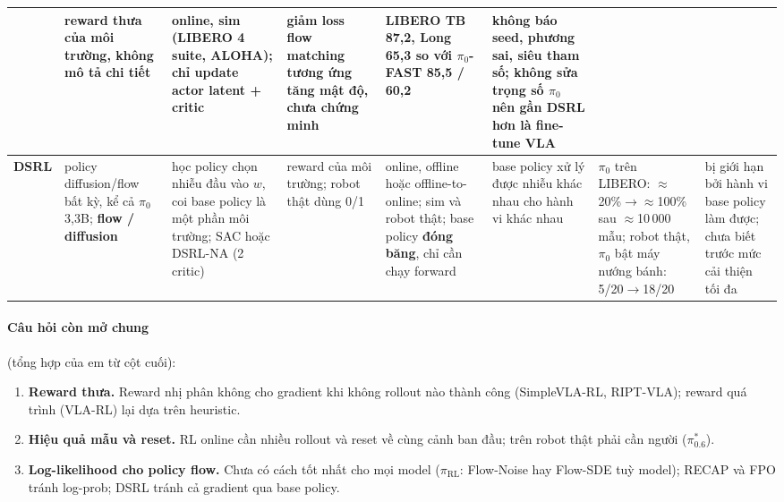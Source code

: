 \documentclass[9pt,a4paper]{extarticle}
\begin{document}
{\begin{longtable}{@{}L{2.0cm} L{2.6cm} L{3.6cm} L{2.7cm} L{3.0cm} L{3.0cm} L{3.3cm} L{3.4cm}@{}}
& reward thưa của môi trường, không mô tả chi tiết
& online, sim (LIBERO 4 suite, ALOHA); chỉ update actor latent + critic
& giảm loss flow matching tương ứng tăng mật độ, chưa chứng minh
& LIBERO TB 87,2, Long 65,3 so với $\pi_0$-FAST 85,5 / 60,2
& không báo seed, phương sai, siêu tham số; không sửa trọng số $\pi_0$ nên gần DSRL hơn là fine-tune VLA \\
\midrule
\textbf{DSRL}
& policy diffusion/flow bất kỳ, kể cả $\pi_0$ 3,3B; \textbf{flow / diffusion}
& học policy chọn nhiễu đầu vào $w$, coi base policy là một phần môi trường; SAC hoặc DSRL-NA (2 critic)
& reward của môi trường; robot thật dùng 0/1
& online, offline hoặc offline-to-online; sim và robot thật; base policy \textbf{đóng băng}, chỉ cần chạy forward
& base policy xử lý được nhiễu khác nhau cho hành vi khác nhau
& $\pi_0$ trên LIBERO: $\approx$20\%$\to\approx$100\% sau $\approx$10\,000 mẫu; robot thật, $\pi_0$ bật máy nướng bánh: 5/20$\to$18/20
& bị giới hạn bởi hành vi base policy làm được; chưa biết trước mức cải thiện tối đa\\
\end{longtable}}

\paragraph{Câu hỏi còn mở chung} (tổng hợp của em từ cột cuối):
\begin{enumerate}[leftmargin=1.5em]
\item \textbf{Reward thưa.} Reward nhị phân không cho gradient khi không rollout nào thành công (SimpleVLA-RL, RIPT-VLA); reward quá trình (VLA-RL) lại dựa trên heuristic.
\item \textbf{Hiệu quả mẫu và reset.} RL online cần nhiều rollout và reset về cùng cảnh ban đầu; trên robot thật phải cần người ($\pi^*_{0.6}$).
\item \textbf{Log-likelihood cho policy flow.} Chưa có cách tốt nhất cho mọi model ($\pi_{\text{RL}}$: Flow-Noise hay Flow-SDE tuỳ model); RECAP và FPO tránh log-prob; DSRL tránh cả gradient qua base policy.
\end{enumerate}

\end{document}
